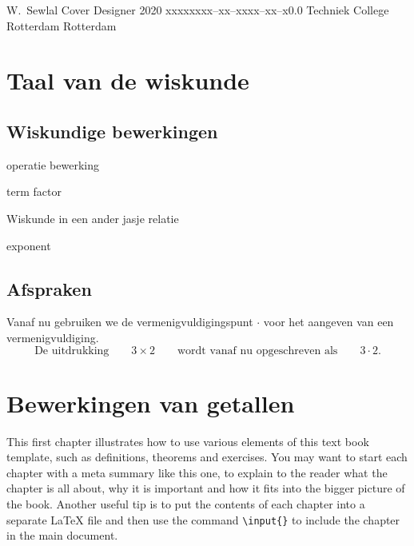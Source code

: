 \documentclass{tstextbook}
\begin{document}
       {W.~Sewlal}
       {Cover Designer}
       {2020}
       {xxxxx}{xxx--xx--xxxx--xx--x}{0.0}
       {Techniek College Rotterdam}
       {Rotterdam}


\chapter{Taal van de wiskunde}
\section{Wiskundige bewerkingen}

operatie
bewerking

term
factor

Wiskunde in een ander jasje
relatie


exponent

\section{Afspraken}
\begin{remark}
    Vanaf nu gebruiken we de vermenigvuldigingspunt $\cdot$ voor het aangeven van een vermenigvuldiging. 
%     
    \[
     \text{De uitdrukking} \qquad  3 \times 2 \qquad \text{wordt vanaf nu opgeschreven als} \qquad 3 \cdot 2.
    \]
\end{remark}

\chapter{Bewerkingen van getallen}
\begin{summary}
  This first chapter illustrates how to use various elements of this
  text book template, such as definitions, theorems and exercises. You
  may want to start each chapter with a meta summary like this one, to
  explain to the reader what the chapter is all about, why it is
  important and how it fits into the bigger picture of the
  book. Another useful tip is to put the contents of each chapter into
  a separate \LaTeX{} file and then use the command
  \texttt{\textbackslash{}input\{\}} to include the chapter in the
  main document.
\end{summary}
\end{document}
